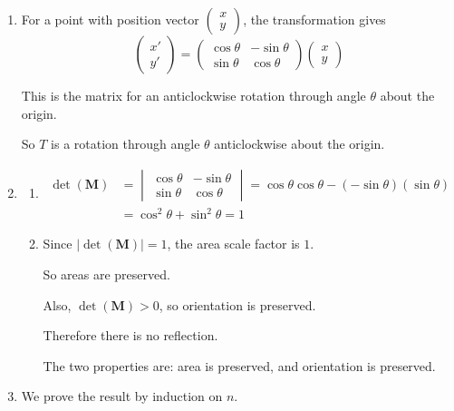 \documentclass[leqno]{article}
\begin{document}
\begin{enumerate}[
  label=\textbf{\arabic*.},
  leftmargin=*,
  topsep=0pt,
  partopsep=0pt,
  parsep=0pt
]
\begin{djsSolution}
\begin{enumerate}[label=\textbf{(\alph*)}]
  \item For a point with position vector $\begin{pmatrix}x\\y\end{pmatrix}$, the transformation gives
  \[
  \begin{pmatrix}x'\\y'\end{pmatrix}
  =
  \begin{pmatrix}
  \cos\theta & -\sin\theta\\
  \sin\theta & \cos\theta
  \end{pmatrix}
  \begin{pmatrix}x\\y\end{pmatrix}
  \]

  This is the matrix for an anticlockwise rotation through angle $\theta$ about the origin.

  So $T$ is a rotation through angle $\theta$ anticlockwise about the origin.

  \item
  \begin{enumerate}[label=(\roman*)]
    \item
    \begin{align*}
    \det(\mathbf{M})
    &=
    \begin{vmatrix}
    \cos\theta & -\sin\theta\\
    \sin\theta & \cos\theta
    \end{vmatrix}
    =
    \cos\theta\cos\theta-(-\sin\theta)(\sin\theta)\\
    &=\cos^2\theta+\sin^2\theta=1
    \end{align*}

    \item Since $|\det(\mathbf{M})|=1$, the area scale factor is $1$.

    So areas are preserved.

    Also, $\det(\mathbf{M})>0$, so orientation is preserved.

    Therefore there is no reflection.

    The two properties are: area is preserved, and orientation is preserved.
  \end{enumerate}

  \item We prove the result by induction on $n$.


\end{enumerate}
\end{djsSolution}
\end{enumerate}
\end{document}
